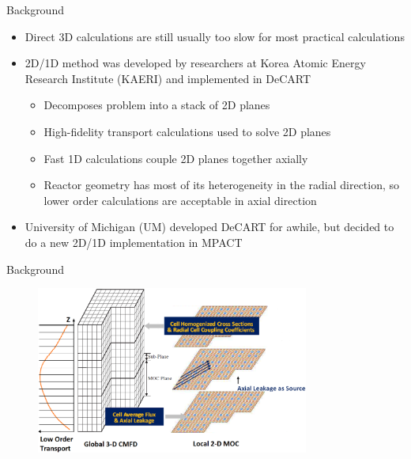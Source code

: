 \begin{frame}[t]{Background}
    
\begin{itemize}
  \item Direct 3D calculations are still usually too slow for most practical 
  calculations
  \item 2D/1D method was developed by researchers at Korea Atomic Energy 
  Research Institute (KAERI) and implemented in DeCART 
  \cite{3DHetWholeCoreTransPlanarMOC,DeCARTTheoryManual,MethodsAndPerformanceOfDecart}
  \begin{itemize}
    \item Decomposes problem into a stack of 2D planes
    \item High-fidelity transport calculations used to solve 2D planes
    \item Fast 1D calculations couple 2D planes together axially
    \item Reactor geometry has most of its heterogeneity in the radial 
    direction, so lower order calculations are acceptable in axial direction
  \end{itemize}
  \item University of Michigan (UM) developed DeCART for awhile, but decided to 
  do a new 2D/1D implementation in MPACT \cite{MPACTTheoryManual}
\end{itemize} 
    
\end{frame}


\begin{frame}[t]{Background}
  
  \begin{figure}[h]
    \centering
    \includegraphics[width=0.8\textwidth]{../figs/2d1d-subplane.png}
  \end{figure}    
  
\end{frame}


